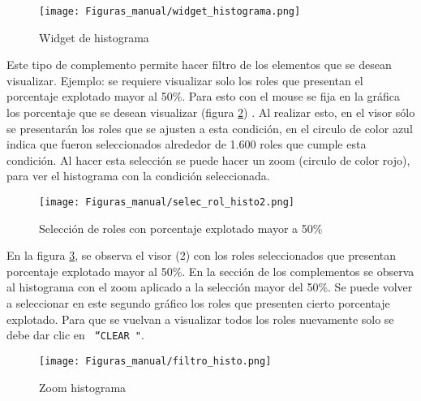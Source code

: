 \documentclass[10pt]{article}
\begin{document}
\begin{figure}[H]
\centering
\texttt{[image: Figuras\_manual/widget\_histograma.png]}
\caption{Widget de histograma}
\label{histo12}
\end{figure}

Este tipo de complemento permite hacer filtro de los elementos que se desean visualizar. Ejemplo: se 
requiere visualizar solo los roles que presentan el porcentaje explotado mayor al 50\%. Para esto con el mouse se fija en la gráfica los porcentaje que se desean visualizar (figura \ref{16}) . Al realizar esto, en el visor sólo se presentarán los roles que se ajusten a esta condición, en el circulo de color azul indica que fueron seleccionados alrededor de 1.600 roles que cumple esta condición. Al hacer esta selección se puede hacer un zoom (circulo de color rojo), para ver el histograma con la condición seleccionada.

\begin{figure}[H]
\centering
\texttt{[image: Figuras\_manual/selec\_rol\_histo2.png]}
\caption{Selección de roles con porcentaje explotado mayor a 50\%}
\label{16}
\end{figure}

En la figura \ref{17}, se observa el visor (2) con los roles seleccionados que presentan porcentaje explotado mayor al 50\%. En la sección de los complementos se observa al histograma con el zoom aplicado a la selección mayor del 50\%. Se puede volver a seleccionar en este segundo gráfico los roles que presenten cierto porcentaje explotado. Para que se vuelvan a visualizar todos los roles nuevamente solo se debe dar clic en \texttt{ “CLEAR "}.


\begin{figure}[H]
\centering
\texttt{[image: Figuras\_manual/filtro\_histo.png]}
\caption{Zoom histograma}
\label{17}
\end{figure}
\end{document}
